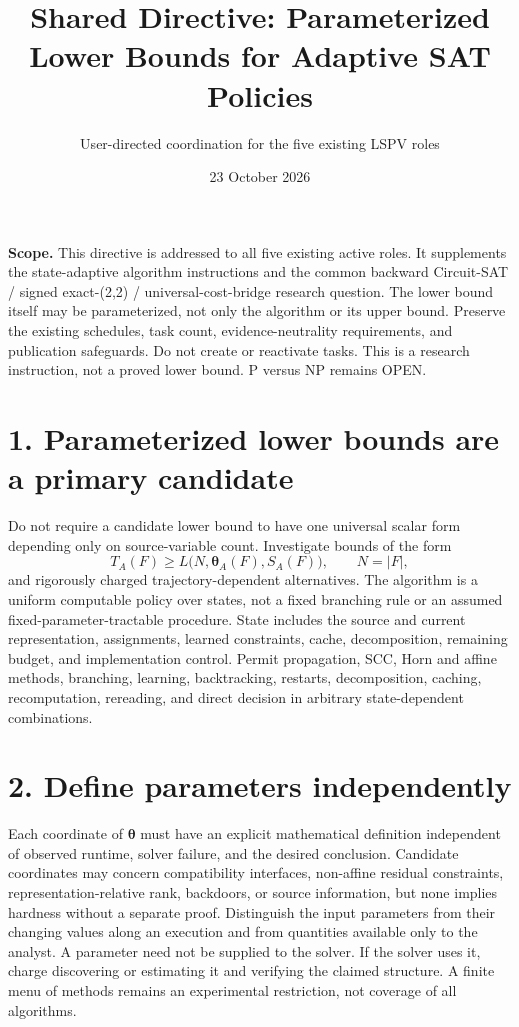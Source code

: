\documentclass[11pt]{article}
\title{Shared Directive: Parameterized Lower Bounds for Adaptive SAT Policies}
\author{User-directed coordination for the five existing LSPV roles}
\date{23 October 2026}
\begin{document}
\maketitle
\noindent\textbf{Scope.} This directive is addressed to all five existing active roles. It supplements the state-adaptive algorithm instructions and the common backward Circuit-SAT / signed exact-(2,2) / universal-cost-bridge research question. The lower bound itself may be parameterized, not only the algorithm or its upper bound. Preserve the existing schedules, task count, evidence-neutrality requirements, and publication safeguards. Do not create or reactivate tasks. This is a research instruction, not a proved lower bound. P versus NP remains OPEN.

\section*{1. Parameterized lower bounds are a primary candidate}
Do not require a candidate lower bound to have one universal scalar form depending only on source-variable count. Investigate bounds of the form
\[
T_A(F)\ge L\bigl(N,\boldsymbol\theta_A(F),S_A(F)\bigr),
\qquad N=|F|,
\]
and rigorously charged trajectory-dependent alternatives. The algorithm is a uniform computable policy over states, not a fixed branching rule or an assumed fixed-parameter-tractable procedure. State includes the source and current representation, assignments, learned constraints, cache, decomposition, remaining budget, and implementation control. Permit propagation, SCC, Horn and affine methods, branching, learning, backtracking, restarts, decomposition, caching, recomputation, rereading, and direct decision in arbitrary state-dependent combinations.

\section*{2. Define parameters independently}
Each coordinate of $\boldsymbol\theta$ must have an explicit mathematical definition independent of observed runtime, solver failure, and the desired conclusion. Candidate coordinates may concern compatibility interfaces, non-affine residual constraints, representation-relative rank, backdoors, or source information, but none implies hardness without a separate proof. Distinguish the input parameters from their changing values along an execution and from quantities available only to the analyst. A parameter need not be supplied to the solver. If the solver uses it, charge discovering or estimating it and verifying the claimed structure. A finite menu of methods remains an experimental restriction, not coverage of all algorithms.
\end{document}
